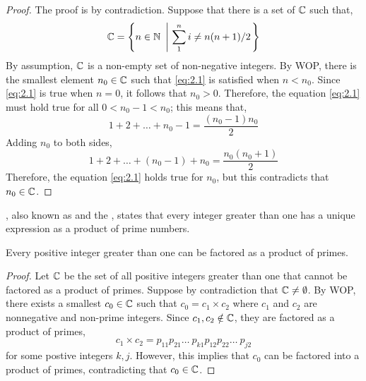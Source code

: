 \begin{proof}
    The proof is by contradiction. Suppose that there is a set of $\mathbb{C}$ such that,
    \begin{equation*}
        \ms{C} = \left\{ n \in \ms{N} \ \left| \ \sum_{1}^{n} i \neq n(n + 1)/2 \right. \right\}
    \end{equation*}
    By assumption, $\mathbb{C}$ is a non-empty set of non-negative integers. By WOP, there is the smallest
    element $n_0 \in \mathbb{C}$ such that \ref{eq:2.1} is satisfied when $n < n_0$. Since \ref{eq:2.1} is true
    when $n = 0$, it follows that $n_0 > 0$. Therefore, the equation \ref{eq:2.1} must hold true for all
    $0 < n_0 - 1 < n_0$; this means that,
    \begin{equation*}
        1 + 2 + \ldots + n_0 - 1 = \dfrac{(n_0 - 1)n_0}{2}
    \end{equation*}
    Adding $n_0$ to both sides,
    \begin{equation*}
        1 + 2 + \ldots + (n_0 - 1) + n_0 = \dfrac{n_0(n_0 + 1)}{2}
    \end{equation*}
    Therefore, the equation \ref{eq:2.1} holds true for $n_0$, but this contradicts
    that ${n_0 \in \mathbb{C}}$.
\end{proof}

, also known as 
and the , states that every integer greater
than one has a unique expression as a product of prime numbers.

\begin{claim}
    Every positive integer greater than one can be factored as a product
    of primes.
\end{claim}

\begin{proof}
    Let $\mathbb{C}$ be the set of all positive integers greater than one
    that cannot be factored as a product of primes. Suppose by contradiction
    that $\mathbb{C} \neq \emptyset$. By WOP, there exists a smallest $c_0 \in \mathbb{C}$ such that $c_0 = c_1 \times c_2$ where
    $c_1$ and $c_2$ are nonnegative and non-prime integers. Since $c_1, c_2 \notin \mathbb{C}$,
    they are factored as a product of primes,
    \begin{equation*}
        c_1 \times c_2 = p_{11}p_{21}\ldots\ p_{k1}p_{12}p_{22}\ldots\ p_{j2}
    \end{equation*}
    for some postive integers $k, j$. However, this implies that $c_0$ can be factored
    into a product of primes, contradicting that $c_0 \in \mathbb{C}$.
\end{proof}

